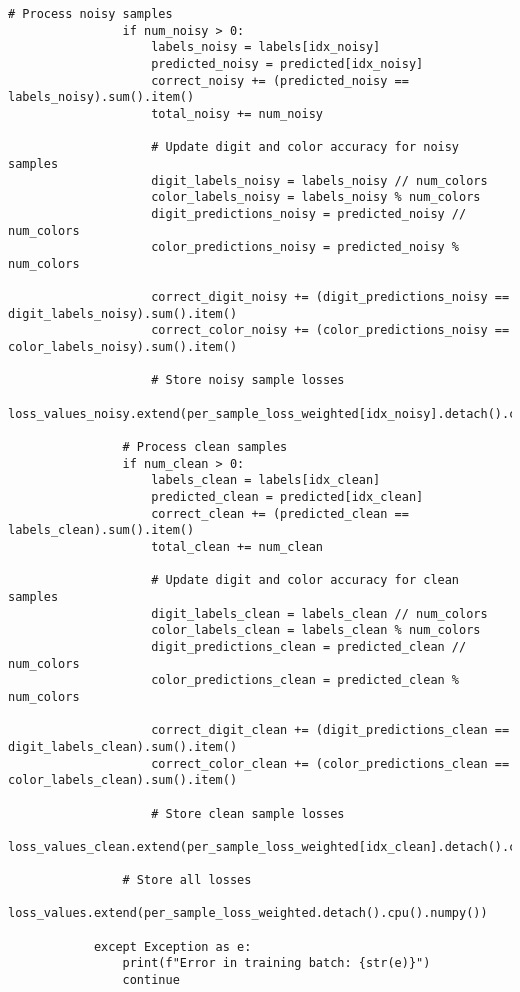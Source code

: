 \begin{lstlisting}[style=pythonstyle, caption={メインコード}]
                # Process noisy samples
                if num_noisy > 0:
                    labels_noisy = labels[idx_noisy]
                    predicted_noisy = predicted[idx_noisy]
                    correct_noisy += (predicted_noisy == labels_noisy).sum().item()
                    total_noisy += num_noisy
    
                    # Update digit and color accuracy for noisy samples
                    digit_labels_noisy = labels_noisy // num_colors
                    color_labels_noisy = labels_noisy % num_colors
                    digit_predictions_noisy = predicted_noisy // num_colors
                    color_predictions_noisy = predicted_noisy % num_colors
    
                    correct_digit_noisy += (digit_predictions_noisy == digit_labels_noisy).sum().item()
                    correct_color_noisy += (color_predictions_noisy == color_labels_noisy).sum().item()
    
                    # Store noisy sample losses
                    loss_values_noisy.extend(per_sample_loss_weighted[idx_noisy].detach().cpu().numpy())
    
                # Process clean samples
                if num_clean > 0:
                    labels_clean = labels[idx_clean]
                    predicted_clean = predicted[idx_clean]
                    correct_clean += (predicted_clean == labels_clean).sum().item()
                    total_clean += num_clean
    
                    # Update digit and color accuracy for clean samples
                    digit_labels_clean = labels_clean // num_colors
                    color_labels_clean = labels_clean % num_colors
                    digit_predictions_clean = predicted_clean // num_colors
                    color_predictions_clean = predicted_clean % num_colors
    
                    correct_digit_clean += (digit_predictions_clean == digit_labels_clean).sum().item()
                    correct_color_clean += (color_predictions_clean == color_labels_clean).sum().item()
    
                    # Store clean sample losses
                    loss_values_clean.extend(per_sample_loss_weighted[idx_clean].detach().cpu().numpy())
    
                # Store all losses
                loss_values.extend(per_sample_loss_weighted.detach().cpu().numpy())
    
            except Exception as e:
                print(f"Error in training batch: {str(e)}")
                continue
    

\end{lstlisting}
